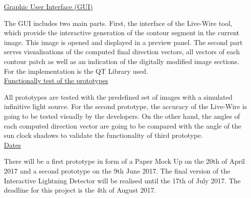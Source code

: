 \underline{Graphic User Interface (GUI)} 

The GUI includes two main parts. First, the interface of the Live-Wire tool, which provide the interactive generation of the contour segment in the current image. This image is opened and displayed in a preview panel. The second part serves visualisations of the computed final direction vectors, all vectors of each contour patch as well as an indication of the digitally modified image sections. For the implementation is the QT Library used. \\ 


\underline{Functionally test of the prototypes} 

All prototypes are tested with the predefined set of images with a simulated infinitive light source. For the second prototype, the accuracy of the Live-Wire is going to be tested visually by the developers. On the other hand, the angles of each computed direction vector are going to be compared with the angle of the sun clock shadows to validate the functionality of  third prototype. \\ 


\underline{Dates} 

There will be a first prototype in form of a Paper Mock Up on the 20th of April 2017
and a second prototype on the 9th June 2017. The final version of the Interactive Lightning Detector will be realised until the 17th of July 2017. The deadline for this project is the 4th of August 2017.


